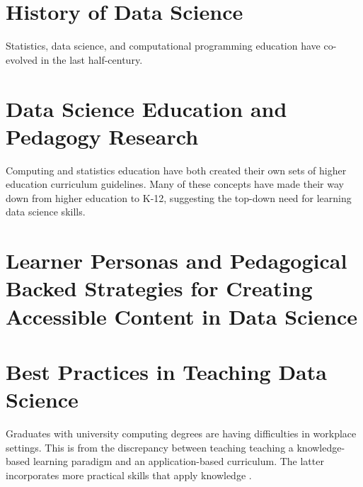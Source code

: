 \documentclass[../main.tex]{subfiles}
\begin{document}
    

    \section{History of Data Science}
        \label{se:intro-ds-history}

        Statistics, data science, and computational programming education
        have co-evolved in the last half-century.

        
        
        
        
        

    \section{Data Science Education and Pedagogy Research}
        \label{se:intro-ds-edu-ped}
    
        Computing and statistics education have both created their own sets of
        higher education curriculum guidelines.
        Many of these concepts have made their way down from higher education to K-12,
        suggesting the top-down need for learning data science skills.

        
        
        
        
    \section{Learner Personas and Pedagogical Backed Strategies for Creating Accessible Content in Data Science}
        \label{se:intro-personas}

        
        
    \section{Best Practices in Teaching Data Science}
        \label{se:intro-teaching-best-practices-ds}
        
        Graduates with university computing degrees are having difficulties in workplace settings.
        This is from the discrepancy between teaching teaching a knowledge-based learning paradigm and an application-based curriculum.
        The latter incorporates more practical skills that apply knowledge
        \cite{cc2005}.
        
\end{document}
